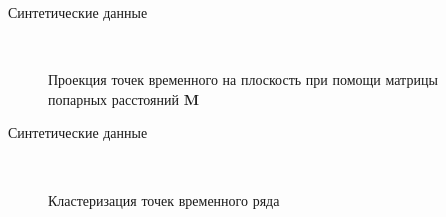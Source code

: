 \documentclass{beamer}
\begin{document}
\begin{frame}{Синтетические данные}
	\begin{figure}[h!t]\center
		\\
		\caption{Проекция точек временного на плоскость при помощи матрицы попарных расстояний $\textbf{M}$}
	\end{figure}
\end{frame}
\begin{frame}{Синтетические данные}
	\begin{figure}[h!t]\center
		\\
		\caption{Кластеризация точек временного ряда}
	\end{figure}
\end{frame}
\end{document}
